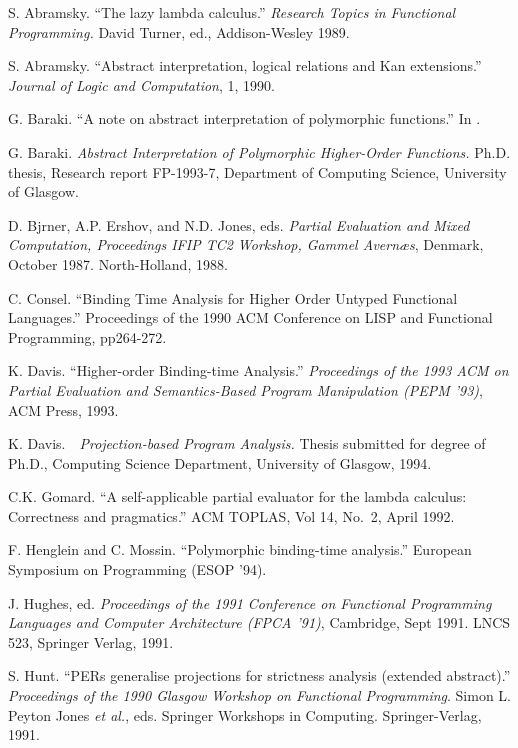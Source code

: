 \begin{thebibliography}{123456}

S. Abramsky. 
``The lazy lambda calculus.'' 
{\it Research Topics in Functional Programming.}
David Turner, ed., Addison-Wesley 1989.

S. Abramsky. 
``Abstract interpretation, logical relations and Kan extensions.''
{\it Journal of Logic and Computation}, 1, 1990.

G. Baraki.
``A note on abstract interpretation of polymorphic functions.''
In \cite{Hug91}.

G. Baraki.
{\it Abstract Interpretation of Polymorphic Higher-Order Functions.}
Ph.D. thesis, Research report FP-1993-7, 
Department of Computing Science, University of Glasgow.

D. Bj{\odash}rner, A.P. Ershov, and N.D. Jones, eds.
{\it Partial Evaluation and Mixed Computation,
Proceedings IFIP TC2 Workshop, Gammel Avern{\ae}s}, Denmark, October 1987.
North-Holland, 1988.

C. Consel. 
``Binding Time Analysis for Higher Order Untyped Functional Languages.''
Proceedings of the 1990 ACM Conference on LISP and 
Functional Programming, pp264-272.

K. Davis.
``Higher-order Binding-time Analysis.'' 
{\it Proceedings of the 1993 ACM on Partial Evaluation and
Semantics-Based Program Manipulation (PEPM '93)},
ACM Press, 1993.

K. Davis.\ \ 
{\it Projection-based Program Analysis.}
Thesis submitted for degree of Ph.D., Computing Science Department,
University of Glasgow, 1994.

C.K. Gomard.
``A self-applicable partial evaluator for the lambda calculus:  Correctness
and pragmatics.''
ACM TOPLAS, Vol 14, No.\ 2, April 1992.

F. Henglein and C. Mossin.
``Polymorphic binding-time analysis.''
European Symposium on Programming (ESOP '94).

J. Hughes, ed.
{\it Proceedings of the 1991 Conference on Functional Programming Languages
and Computer Architecture (FPCA '91)}, Cambridge, Sept 1991. LNCS 523,
Springer Verlag, 1991.

S. Hunt.
``PERs generalise projections for strictness analysis (extended abstract).''
{\it Proceedings of the 1990 Glasgow Workshop
on Functional Programming}.
Simon L. Peyton Jones {\it et al.}, eds.
Springer Workshops in Computing.
Springer-Verlag, 1991.


\end{thebibliography}
